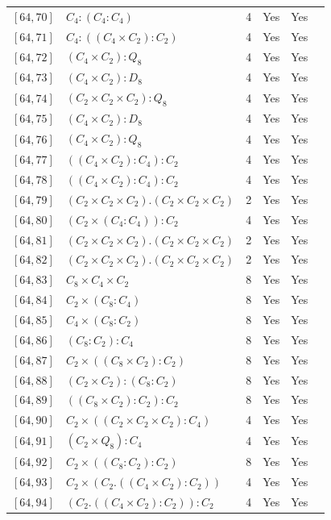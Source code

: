 \documentclass[12pt, a4paper]{article}
\theoremstyle{plain}
\theoremstyle{definition}
\begin{document}
\begin{longtable}{llcccl}
  $[64,70]$ & $C_4 : (C_4 : C_4)$ & 4 & Yes & Yes \\
  $[64,71]$ & $C_4 : ((C_4 \times C_2) : C_2)$ & 4 & Yes & Yes \\
  $[64,72]$ & $(C_4 \times C_2) : Q_8$ & 4 & Yes & Yes \\
  $[64,73]$ & $(C_4 \times C_2) : D_8$ & 4 & Yes & Yes \\
  $[64,74]$ & $(C_2 \times C_2 \times C_2) : Q_8$ & 4 & Yes & Yes \\
  $[64,75]$ & $(C_4 \times C_2) : D_8$ & 4 & Yes & Yes \\
  $[64,76]$ & $(C_4 \times C_2) : Q_8$ & 4 & Yes & Yes \\
  $[64,77]$ & $((C_4 \times C_2) : C_4) : C_2$ & 4 & Yes & Yes \\
  $[64,78]$ & $((C_4 \times C_2) : C_4) : C_2$ & 4 & Yes & Yes \\
  $[64,79]$ & $(C_2 \times C_2 \times C_2) . (C_2 \times C_2 \times C_2)$ & 2 & Yes & Yes \\
  $[64,80]$ & $(C_2 \times (C_4 : C_4)) : C_2$ & 4 & Yes & Yes \\
  $[64,81]$ & $(C_2 \times C_2 \times C_2) . (C_2 \times C_2 \times C_2)$ & 2 & Yes & Yes \\
  $[64,82]$ & $(C_2 \times C_2 \times C_2) . (C_2 \times C_2 \times C_2)$ & 2 & Yes & Yes \\
  $[64,83]$ & $C_8 \times C_4 \times C_2$ & 8 & Yes & Yes \\
  $[64,84]$ & $C_2 \times (C_8 : C_4)$ & 8 & Yes & Yes \\
  $[64,85]$ & $C_4 \times (C_8 : C_2)$ & 8 & Yes & Yes \\
  $[64,86]$ & $(C_8 : C_2) : C_4$ & 8 & Yes & Yes \\
  $[64,87]$ & $C_2 \times ((C_8 \times C_2) : C_2)$ & 8 & Yes & Yes \\
  $[64,88]$ & $(C_2 \times C_2) : (C_8 : C_2)$ & 8 & Yes & Yes \\
  $[64,89]$ & $((C_8 \times C_2) : C_2) : C_2$ & 8 & Yes & Yes \\
  $[64,90]$ & $C_2 \times ((C_2 \times C_2 \times C_2) : C_4)$ & 4 & Yes & Yes \\
  $[64,91]$ & $(C_2 \times Q_8) : C_4$ & 4 & Yes & Yes \\
  $[64,92]$ & $C_2 \times ((C_8 : C_2) : C_2)$ & 8 & Yes & Yes \\
  $[64,93]$ & $C_2 \times (C_2 . ((C_4 \times C_2) : C_2))$ & 4 & Yes & Yes \\
  $[64,94]$ & $(C_2 . ((C_4 \times C_2) : C_2)) : C_2$ & 4 & Yes & Yes \\

\end{longtable}
\end{document}
